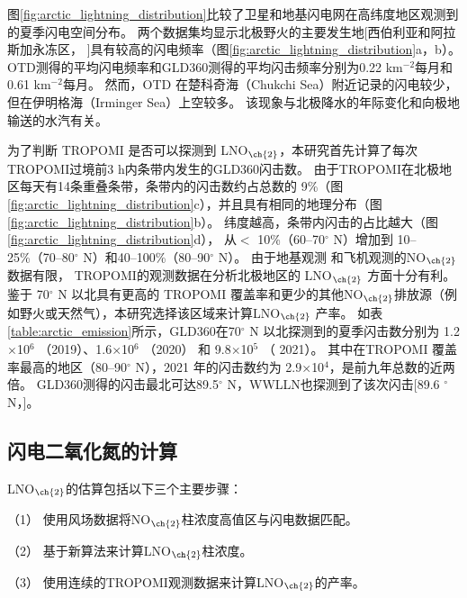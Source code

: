图\ref{fig:arctic_lightning_distribution}比较了卫星和地基闪电网在高纬度地区观测到的夏季闪电空间分布。
两个数据集均显示北极野火的主要发生地[西伯利亚和阿拉斯加永冻区，
\citep{McCarty.2021}]具有较高的闪电频率（图\ref{fig:arctic_lightning_distribution}a，b）。
OTD测得的平均闪电频率和GLD360测得的平均闪击频率分别为0.22 km$^{-2}$每月和0.61 km$^{-2}$每月。
然而，OTD 在楚科奇海（Chukchi Sea）附近记录的闪电较少，但在伊明格海（Irminger Sea）上空较多。
该现象与北极降水的年际变化和向极地输送的水汽有关\citep{Bintanja.2020}。

为了判断 TROPOMI 是否可以探测到 LNO$_{\ch{2}}$，本研究首先计算了每次TROPOMI过境前3 h内条带内发生的GLD360闪击数。
由于TROPOMI在北极地区每天有14条重叠条带，条带内的闪击数约占总数的 9\%（图\ref{fig:arctic_lightning_distribution}c），并且具有相同的地理分布（图\ref{fig:arctic_lightning_distribution}b）。
纬度越高，条带内闪击的占比越大（图\ref{fig:arctic_lightning_distribution}d），
从$<$ 10\%（60--70$^{\circ}$ N）增加到 10--25\%（70--80$^{\circ}$ N）和40--100\%（80--90$^{\circ}$ N）。
由于地基观测\citep{Schmale.2018} 和飞机观测\citep{Jacob.2010}的NO$_{\ch{2}}$数据有限，
TROPOMI的观测数据在分析北极地区的 LNO$_{\ch{2}}$ 方面十分有利。
鉴于 70$^{\circ}$ N 以北具有更高的 TROPOMI 覆盖率和更少的其他NO$_{\ch{2}}$排放源（例如野火或天然气），本研究选择该区域来计算LNO$_{\ch{2}}$ 产率。
如表\ref{table:arctic_emission}所示，GLD360在70$^{\circ}$ N 以北探测到的夏季闪击数分别为 1.2$\times$10$^6$ （2019）、1.6$\times$10$^6$ （2020） 和 9.8$\times$10$^5$ （ 2021）。
其中在TROPOMI 覆盖率最高的地区（80--90$^{\circ}$ N），2021 年的闪击数约为 2.9$\times$10$^4$，是前九年总数的近两倍\citep{networktotal.2021}。
GLD360测得的闪击最北可达89.5$^{\circ}$ N，WWLLN也探测到了该次闪击[89.6 $^{\circ}$ N，\citet{Holzworth.2021}]。

\subsection{闪电二氧化氮的计算} \label{sec:arctic_lnox_calc}

LNO$_{\ch{2}}$的估算包括以下三个主要步骤：

（1） 使用风场数据将NO$_{\ch{2}}$柱浓度高值区与闪电数据匹配。

（2） 基于新算法来计算LNO$_{\ch{2}}$柱浓度。

（3） 使用连续的TROPOMI观测数据来计算LNO$_{\ch{2}}$的产率。


